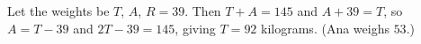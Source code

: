 Let the weights be $T$, $A$, $R=39$. Then $T+A=145$ and $A+39=T$, so $A=T-39$ and $2T-39=145$, giving $T=\boxed{92}$ kilograms. (Ana weighs $53$.)
